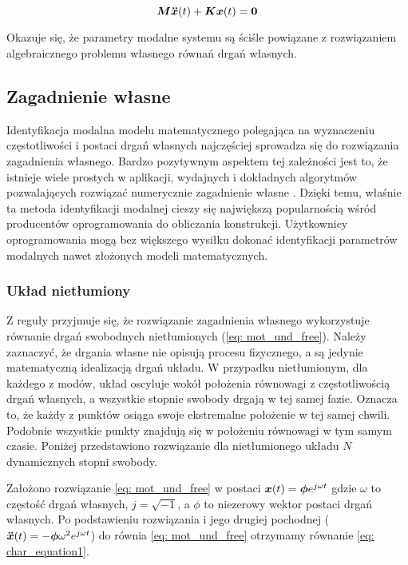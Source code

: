 \begin{equation} \label{eq: mot_und_free}
\bm{M} \bm{\ddot{x}}(t) +\bm{Kx}(t) = \bm{0}
\end{equation}


Okazuje się, że parametry modalne systemu są ściśle powiązane z rozwiązaniem algebraicznego problemu własnego równań drgań własnych. 

\subsection{Zagadnienie własne}
Identyfikacja modalna modelu matematycznego polegająca na wyznaczeniu częstotliwości i postaci drgań własnych najczęściej sprowadza się do rozwiązania zagadnienia własnego. Bardzo pozytywnym aspektem tej zależności jest to, że istnieje wiele prostych w aplikacji, wydajnych i dokładnych algorytmów pozwalających rozwiązać numerycznie zagadnienie własne \parencite{Golub2013}. Dzięki temu, właśnie ta metoda identyfikacji modalnej cieszy się największą popularnością wśród producentów oprogramowania do obliczania konstrukcji. Użytkownicy oprogramowania mogą bez większego wysiłku dokonać identyfikacji parametrów modalnych nawet złożonych modeli matematycznych. 
\subsubsection{Układ nietłumiony}
Z reguły przyjmuje się, że rozwiązanie zagadnienia własnego wykorzystuje równanie drgań swobodnych nietłumionych (\ref{eq: mot_und_free}). Należy zaznaczyć, że drgania własne nie opisują procesu fizycznego, a są jedynie matematyczną idealizacją drgań układu. W przypadku nietłumionym, dla każdego z modów, układ oscyluje wokół położenia równowagi z częstotliwością drgań własnych, a wszystkie stopnie swobody drgają w tej samej fazie. Oznacza to, że każdy z punktów osiąga swoje ekstremalne położenie w tej samej chwili. Podobnie wszystkie punkty znajdują się w położeniu równowagi w tym samym czasie. Poniżej przedstawiono rozwiązanie dla nietłumionego układu $N$ dynamicznych stopni swobody.

Założono rozwiązanie \ref{eq: mot_und_free} w postaci $\bm{x}(t)=\bm{\phi}e^{j\omega t}$ gdzie $\omega$ to częstość drgań własnych, $j=\sqrt{-1}$, a $\phi$ to niezerowy wektor postaci drgań własnych. Po podstawieniu rozwiązania i jego drugiej pochodnej ($\bm{\ddot{x}}(t)=-\bm{\phi} \omega^2 e^{j\omega t}$) do równia \ref{eq: mot_und_free} otrzymamy równanie \ref{eq: char_equation1}.

